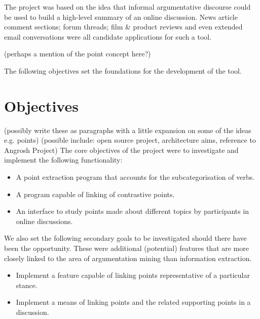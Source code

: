     The project was based on the idea that informal argumentative discourse could be used to build a high-level summary of an online discussion. News article comment sections; forum threads; film \& product reviews and even extended email conversations were all candidate applications for such a tool.

    (perhaps a mention of the point concept here?)

    The following objectives set the foundations for the development of the tool.

  \section{Objectives}
    (possibly write these as paragraphs with a little expansion on some of the ideas e.g. points)
    (possible include: open source project, architecture aims, reference to Angrosh Project)
    The core objectives of the project were to investigate and implement the following functionality:
    \begin{itemize}
      \item{A point extraction program that accounts for the subcategorisation of verbs.}
      \item{A program capable of linking of contrastive points.}
      \item{An interface to study points made about different topics by participants in online discussions.}
    \end{itemize}
    We also set the following secondary goals to be investigated should there have been the opportunity. These were additional (potential) features that are more closely linked to the area of argumentation mining than information extraction.
    \begin{itemize}
      \item{Implement a feature capable of linking points representative of a particular stance.}
      \item{Implement a means of linking points and the related supporting points in a discussion.}
    \end{itemize}
